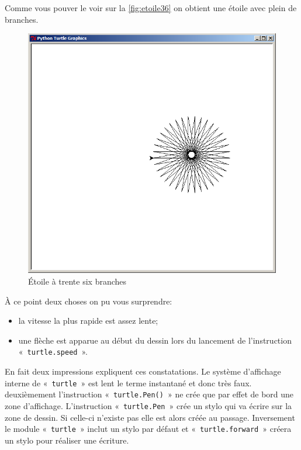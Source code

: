 Comme vous pouver le voir sur la \autoref{fig:etoile36} on obtient une étoile avec plein de branches.
\begin{figure}[h!]
\centering
\includegraphics[scale=0.4]{images/etoile36}
\caption{Étoile à trente six branches}\label{fig:etoile36}
\end{figure}

À ce point deux choses on pu vous surprendre:
\begin{itemize}
\item la vitesse la plus rapide est assez lente;
\item une flèche est apparue au début du dessin lors du lancement de l'instruction\\
«~\texttt{turtle.speed}~». 
\end{itemize}

En fait deux impressions expliquent ces constatations. Le système d'affichage interne de «~\texttt{turtle}~» est lent le terme instantané et donc très faux. deuxièmement l'instruction «~\texttt{turtle.Pen()}~» ne crée que par effet de bord une zone d'affichage. L'instruction «~\texttt{turtle.Pen}~» crée un stylo qui va écrire sur la zone de dessin. Si celle-ci n'existe pas elle est alors créée au passage. Inversement le module «~\texttt{turtle}~» inclut un stylo par défaut et «~\texttt{turtle.forward}~» créera un stylo pour réaliser une écriture.

